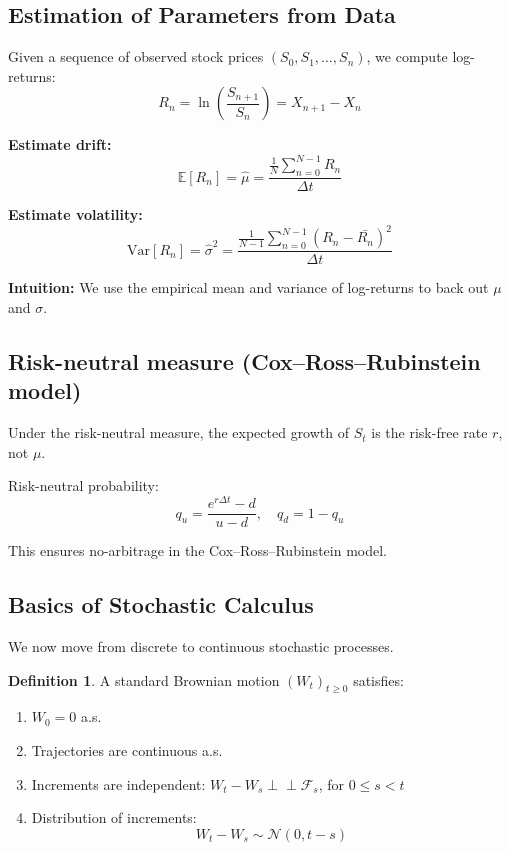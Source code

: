 \documentclass[12pt,a4paper]{article}
\theoremstyle{definition}
\newtheorem{definition}{Definition}[section]
\newcommand{\Var}{\text{Var}}
\begin{document}
\subsection{Estimation of Parameters from Data}

Given a sequence of observed stock prices $(S_0, S_1, \dots, S_n)$, we compute log-returns:
\[
R_n = \ln\!\left(\frac{S_{n+1}}{S_n}\right) = X_{n+1} - X_n
\]

\textbf{Estimate drift:}
\[
\mathbb{E}[R_n] = \hat{\mu} = \frac{\frac{1}{N} \sum_{n=0}^{N-1} R_n}{\Delta t}
\]

\textbf{Estimate volatility:}
\[
  \Var[R_n] = \hat{\sigma}^2 = \frac{\frac{1}{N-1} \sum_{n=0}^{N-1} (R_n - \bar{R_n})^2}{\Delta t}
\]

\textbf{Intuition:} We use the empirical mean and variance of log-returns to back out $\mu$ and $\sigma$.

\subsection{Risk-neutral measure (Cox–Ross–Rubinstein model)}

Under the risk-neutral measure, the expected growth of $S_t$ is the risk-free rate $r$, not $\mu$.

Risk-neutral probability:
\[
q_u = \frac{e^{r\Delta t} - d}{u - d}, \quad q_d = 1 - q_u
\]

This ensures no-arbitrage in the Cox–Ross–Rubinstein model.

\subsection{Basics of Stochastic Calculus}

We now move from discrete to continuous stochastic processes.

\begin{definition}
A standard Brownian motion $(W_t)_{t \ge 0}$ satisfies:
\begin{enumerate}
\item $W_0 = 0$ a.s.
\item Trajectories are continuous a.s.
\item Increments are independent: $W_t - W_s \perp \!\!\!\perp \mathcal{F}_s$, for $0 \le s < t$
\item Distribution of increments:
\[
W_t - W_s \sim \mathcal{N}(0, t-s)
\]
\end{enumerate}
\end{definition}
\end{document}
